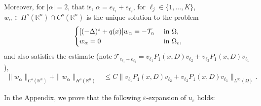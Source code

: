 \documentclass [oneside,11pt] {amsart}
\numberwithin{equation}{section}
\newcommand{\R}{\mathbb{R}}
\begin{document}
Moreover, for $|\alpha|=2$, that is, $\alpha=e_{\ell_1}+e_{\ell_2}$, for $\ell_j\in \{1,\ldots, K\}$,
$w_{\alpha} \in H^s(\R^n)\cap C^{s}(\R^n)$ is the unique solution to the problem
\begin{equation}\label{eq_3_linear_w}
\begin{cases}
[(-\Delta)^s + q(x)]w_{\alpha}=-\mathcal{T}_{\alpha} 
&\hbox{ in } \Omega,\\
w_{\alpha}= 0 &\hbox{ in } \Omega_e,
\end{cases}
\end{equation}
and also satisfies the estimate (note $\mathcal{T}_{e_{\ell_1}+e_{\ell_2}} = v_{\ell_1}P_1(x,D)v_{\ell_2}+ v_{\ell_2}P_1(x,D)v_{\ell_1}$),
\begin{equation}\label{eq_3_linear_w2_est}
\begin{aligned}
\|w_{\alpha}\|_{C^{s}(\R^n)}+ \|w_{\alpha}\|_{H^{s}(\R^n)}
&\le C\|v_{\ell_1}P_1(x,D)v_{\ell_2}+ v_{\ell_2}P_1(x,D)v_{\ell_1}\|_{L^\infty(\Omega)}.
\end{aligned}
\end{equation}

In the Appendix, we prove that the following $\varepsilon$-expansion of $u_\varepsilon$ holds:
\end{document}
